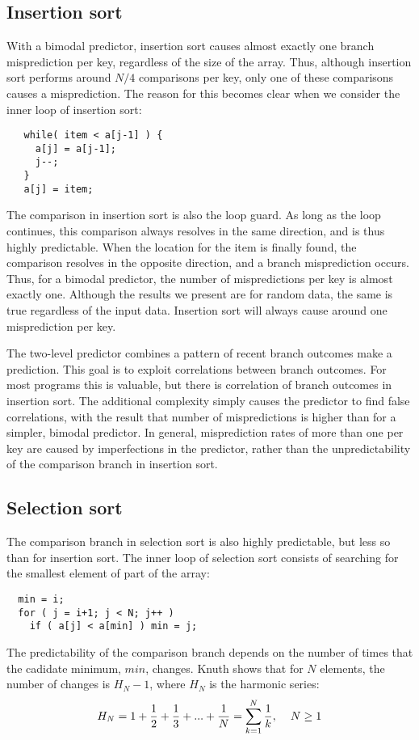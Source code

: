 \documentclass[acmtocl]{acmtrans2m}
\begin{document}
\subsection{Insertion sort}
With a bimodal predictor, insertion sort causes almost exactly one
branch misprediction per key, regardless of the size of the array.
Thus, although insertion sort performs around $N/4$ comparisons per
key, only one of these comparisons causes a misprediction. The
reason for this becomes clear when we consider the inner loop
of insertion sort:
\begin{verbatim}
   while( item < a[j-1] ) {
     a[j] = a[j-1];
     j--;
   }
   a[j] = item;
\end{verbatim}

The comparison in insertion sort is also the loop guard.  As long as
the loop continues, this comparison always resolves in the same
direction, and is thus highly predictable. When the location for the
item is finally found, the comparison resolves in the opposite
direction, and a branch misprediction occurs. Thus, for a bimodal
predictor, the number of mispredictions per key is almost exactly
one. Although the results we present are for random data, the same
is true regardless of the input data. Insertion sort will always
cause around one misprediction per key.

The two-level predictor combines a pattern of recent branch outcomes
make a prediction. This goal is to exploit correlations between branch
outcomes. For most programs this is valuable, but there is correlation
of branch outcomes in insertion sort. The additional complexity simply
causes the predictor to find false correlations, with the result that
number of mispredictions is higher than for a simpler, bimodal
predictor. In general, misprediction rates of more than one per key
are caused by imperfections in the predictor, rather than the
unpredictability of the comparison branch in insertion sort.

\subsection{Selection sort}
The comparison branch in selection sort is also highly predictable,
but less so than for insertion sort. The inner loop of selection
sort consists of searching for the smallest element of part of
the array:
\begin{verbatim}
  min = i;
  for ( j = i+1; j < N; j++ )
    if ( a[j] < a[min] ) min = j;
\end{verbatim}
The predictability of the comparison branch depends on the number of
times that the cadidate minimum, $min$, changes. Knuth \cite{Knuth97}
shows that for $N$ elements, the number of changes is $H_N - 1$, where
$H_N$ is the harmonic series:
$$H_N = 1 + \frac{1}{2} + \frac{1}{3} + ... + \frac{1}{N} =  \sum_{k=1}^{N}
\frac{1}{k},  \hspace{0.4cm}  N \geq 1$$
\end{document}
